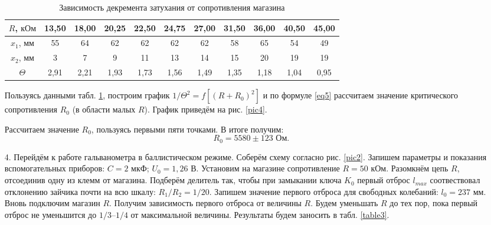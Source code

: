 \documentclass[a4paper, 12pt]{article}
\begin{document}
\begin{enumerate}
        \begin{table}[ht]
            \centering
            \begin{tabular}{|c||c|c|c|c|c|c|c|c|c|c|}
                \hline
                $R$, $\text{кОм}$ & 13,50 & 18,00 & 20,25 & 22,50 & 24,75 & 27,00 & 31,50 & 36,00 & 40,50 & 45,00 \\
                \hline
                $x_1$, $\text{мм}$ & 55 & 64 & 62 & 62 & 62 & 62 & 58 & 65 & 54 & 49 \\
                \hline
                $x_2$, $\text{мм}$ & 3 & 7 & 9 & 11 & 13 & 14 & 15 & 20 & 19 & 19 \\
                \hline
                $\Theta$ & 2,91 & 2,21 & 1,93 & 1,73 & 1,56 & 1,49 & 1,35 & 1,18 & 1,04 & 0,95 \\
                \hline
            \end{tabular}
            \caption{Зависимость декремента затухания от сопротивления магазина}
            \label{table2}
        \end{table}
        
        Пользуясь данными табл. \ref{table2}, построим график $1/\Theta^2 = f[(R + R_0)^2]$ и по формуле \eqref{eq5} рассчитаем значение критического сопротивления $R_0$ (в области малых $R$). График приведём на рис. \ref{pic4}.
        
        Рассчитаем значение $R_0$, пользуясь первыми пяти точками. В итоге получим:
        \begin{equation}
            R_0 = 5580 \pm 123 \text{ Ом}.
        \end{equation}
        
        
        \item[4.] Перейдём к работе гальванометра в баллистическом режиме. Соберём схему согласно рис. \ref{pic2}. Запишем параметры и показания вспомогательных приборов: $C = 2 \text{ мкФ}$; $U_0 = 1,26 \text{ В}$. Установим на магазине сопротивление $R = 50 \text{ кОм}$. Разомкнём цепь $R$, отсоединив одну из клемм от магазина. Подберём делитель так, чтобы при замыкании ключа $K_0$ первый отброс $l_{max}$ соотвествовал отклонению зайчика почти на всю шкалу: $R_1/R_2 = 1/20$. Запишем значение первого отброса для свободных колебаний: $l_0 = 237 \text{ мм}$. Вновь подключим магазин $R$. Получим зависимость первого отброса от величины $R$. Будем уменьшать $R$ до тех пор, пока первый отброс не уменьшится до $1/3 – 1/4$ от максимальной величины. Результаты будем заносить в табл. \ref{table3}.
        

\end{enumerate}
\end{document}
